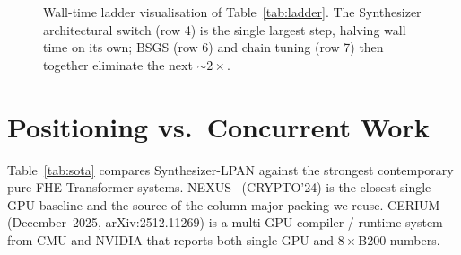 \documentclass[11pt,a4paper]{article}
\newcommand{\Bbatch}{N_{\mathrm{BATCH}}}
\begin{document}
\begin{figure}[h]
\centering
{}
\caption{Wall-time ladder visualisation of Table~\ref{tab:ladder}.
The Synthesizer architectural switch (row 4) is the single largest
step, halving wall time on its own; BSGS (row 6) and chain tuning
(row 7) then together eliminate the next $\sim 2\times$.}
\label{fig:ladder}
\end{figure}

\section{Positioning vs.\ Concurrent Work}

Table~\ref{tab:sota} compares Synthesizer-LPAN against the strongest
contemporary pure-FHE Transformer systems.  NEXUS~\cite{zhang2024nexus}
(CRYPTO'24) is the closest single-GPU baseline and the source of the
column-major packing we reuse.  CERIUM~\cite{cerium2025} (December~2025,
arXiv:2512.11269) is a multi-GPU compiler / runtime system from
CMU and NVIDIA that reports both single-GPU and $8\times$B200
numbers.
\end{document}
